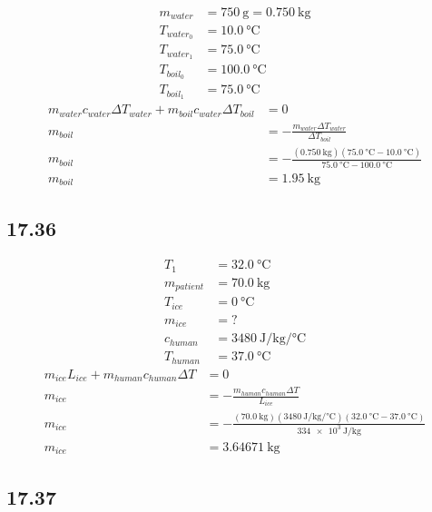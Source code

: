 \documentclass{article}
\begin{document}
\begin{align*}
	m_{water} & = \SI{750}{\gram} = \SI{0.750}{\kilogram} \\
	T_{water_0} & = \SI{10.0}{\celsius} \\
	T_{water_1} & = \SI{75.0}{\celsius} \\
	T_{boil_0} & = \SI{100.0}{\celsius} \\
	T_{boil_1} & = \SI{75.0}{\celsius}
\end{align*}
\begin{align*}
	m_{water}c_{water}\Delta T_{water} + m_{boil}c_{water}\Delta T_{boil} & = 0 \\
	m_{boil} & = -\frac{ m_{water}\Delta T_{water} }{ \Delta T_{boil} } \\
	m_{boil} & = -\frac{ (\SI{0.750}{\kilogram})(\SI{75.0}{\celsius} - \SI{10.0}{\celsius}) }{ \SI{75.0}{\celsius} - \SI{100.0}{\celsius} } \\
	m_{boil} & = \SI{1.95}{\kilogram}
\end{align*}

\subsection{17.36}

\begin{align*}
	T_1 & = \SI{32.0}{\celsius} \\
	m_{patient} & = \SI{70.0}{\kilogram} \\
	T_{ice} & = \SI{0}{\celsius} \\
	m_{ice} & = ? \\
	c_{human} & = \SI{3480}{\joule \per \kilogram \per \celsius} \\
	T_{human} & = \SI{37.0}{\celsius}
\end{align*}
\begin{align*}
	m_{ice}L_{ice} + m_{human}c_{human}\Delta T & = 0 \\
	m_{ice} & = -\frac{ m_{human}c_{human}\Delta T }{ L_{ice} } \\
	m_{ice} & = -\frac{ (\SI{70.0}{\kilogram})(\SI{3480}{\joule \per \kilogram \per \celsius})(\SI{32.0}{\celsius} - \SI{37.0}{\celsius}) }{ \SI{334e3}{\joule \per \kilogram} } \\
	m_{ice} & = \SI{3.64671}{\kilogram}
\end{align*}

\subsection{17.37}
\end{document}

